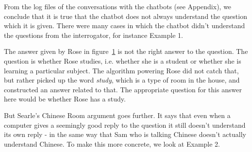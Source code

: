 From the log files of the conversations with the chatbots (see Appendix), we conclude that it is true that the chatbot does not always understand the question which it is given. There were many cases in which the chatbot didn't understand the questions from the interrogator, for instance Example 1.

\begin{figure}[ht]
   \begin{center}
   \end{center}
   \label{Example1}
\end{figure}

The answer given by Rose in figure~\ref{Example1} is not the right answer to the question. The question is whether Rose studies, i.e. whether she is a student or whether she is learning a particular subject. The algorithm powering Rose did not catch that, but rather picked up the word \textit{study}, which is a type of room in the house, and constructed an answer related to that. The appropriate question for this answer here would be whether Rose has a study.

But Searle's Chinese Room argument goes further. It says that even when a computer gives a seemingly good reply to the question it still doesn't understand its own reply - in the same way that Sam who is talking Chinese doesn't actually understand Chinese. To make this more concrete, we look at Example 2.

\begin{figure}[ht]
   \begin{center}
   \end{center}
   \label{Example2}
\end{figure}

